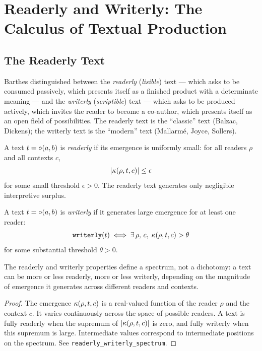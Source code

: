 \section{Readerly and Writerly: The Calculus of Textual Production}

\subsection{The Readerly Text}

Barthes distinguished between the \emph{readerly} (\textit{lisible})
text --- which asks to be consumed passively, which presents itself as
a finished product with a determinate meaning --- and the \emph{writerly}
(\textit{scriptible}) text --- which asks to be produced actively, which
invites the reader to become a co-author, which presents itself as an
open field of possibilities. The readerly text is the ``classic'' text
(Balzac, Dickens); the writerly text is the ``modern'' text (Mallarm\'e,
Joyce, Sollers).

\begin{definition}
\label{def:readerly}
A text $t = \circ(a, b)$ is \emph{readerly} if its emergence is
uniformly small: for all readers $\rho$ and all contexts $c$,
\[
  |\kappa(\rho, t, c)| \leq \epsilon
\]
for some small threshold $\epsilon > 0$. The readerly text generates
only negligible interpretive surplus.
\end{definition}

\begin{definition}
\label{def:writerly}
A text $t = \circ(a, b)$ is \emph{writerly} if it generates large
emergence for at least one reader:
\[
  \texttt{writerly}(t) \iff \exists\, \rho,\, c,\;
  \kappa(\rho, t, c) > \theta
\]
for some substantial threshold $\theta > 0$.
\end{definition}

\begin{theorem}
\label{thm:readerly-writerly}
The readerly and writerly properties define a spectrum, not a
dichotomy: a text can be more or less readerly, more or less
writerly, depending on the magnitude of emergence it generates
across different readers and contexts.
\end{theorem}

\begin{proof}
The emergence $\kappa(\rho, t, c)$ is a real-valued function of the
reader $\rho$ and the context $c$. It varies continuously across the
space of possible readers. A text is fully readerly when the supremum
of $|\kappa(\rho, t, c)|$ is zero, and fully writerly when this
supremum is large. Intermediate values correspond to intermediate
positions on the spectrum. See \texttt{readerly\_writerly\_spectrum}.
\end{proof}


